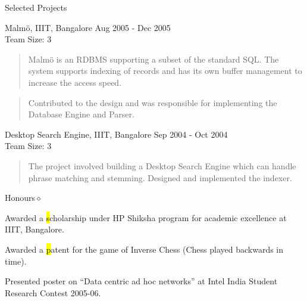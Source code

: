 \documentclass{resume}
\newcommand{\teamsize}{\\\sc\footnotesize Team Size: }
\begin{document}
\begin{category}{Selected Projects}{}
    \item {\topic Malm\"o,} IIIT, Bangalore
        {\period Aug 2005 - Dec 2005}
        {\teamsize 3}
        \begin{quote}
            Malm\"o is an RDBMS supporting a subset of the standard SQL. The
            system supports indexing of records and has its own buffer
            management to increase the access speed.
        \end{quote}
        \begin{quote}
            Contributed to the design and was responsible for implementing the
            Database Engine and Parser.
         \end{quote}

    \item {\topic Desktop Search Engine,} IIIT, Bangalore
        {\period Sep 2004 - Oct 2004}
        {\teamsize 3}
        \begin{quote}
            The project involved building a Desktop Search Engine which can
            handle phrase matching and stemming. Designed and implemented the
            indexer.
        \end{quote}

\end{category}


\begin{category}{Honours}{$\diamond$}

    \item Awarded a {\hl scholarship} under HP Shiksha program for academic
        excellence at IIIT, Bangalore.

    \item Awarded a {\hl patent} for the game of Inverse Chess (Chess played
        backwards in time).

    \item Presented poster on ``Data centric ad hoc networks'' at Intel India
        Student Research Contest 2005-06.

\end{category}
\end{document}
